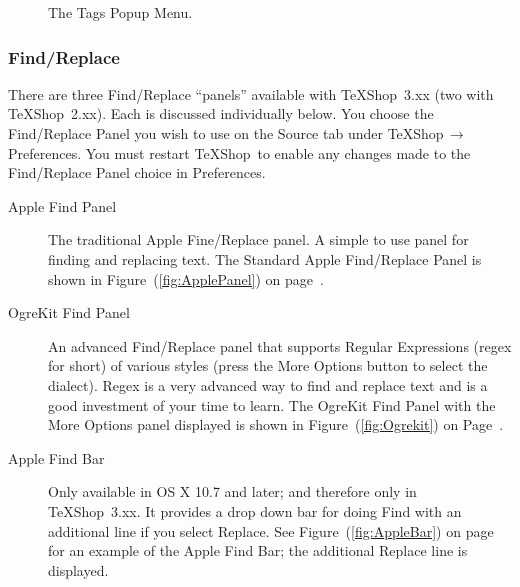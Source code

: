 \documentclass[letterpaper,11pt]{article}
\newcommand{\TS}{\textsf{\TeX Shop}}
\newcommand{\acr}[1]{\textsf{#1}}
\newcommand{\cmd}[1]{\textsf{#1}}
\newcommand{\mnu}[1]{\textsf{#1}}
\newcommand{\To}{\,\(\to\)\,}
\begin{document}
\begin{figure}
\centering
{}
\caption{The Tags Popup Menu.}
\label{fig:Tags}
\end{figure}

\subsubsection{Find/Replace}

There are three \acr{Find/Replace} ``panels'' available with \TS\ 3.xx (two with \TS\ 2.xx). Each is discussed individually below. You choose the Find/Replace Panel you wish to use on the \mnu{Source} tab under \mnu{TeXShop}\To\mnu{Preferences}. You must restart \TS\ to enable any changes made to the Find/Replace Panel choice in \mnu{Preferences}.
\begin{description}
\item[Apple Find Panel]
The traditional Apple Fine/Replace panel. A simple to use panel for finding and replacing text.   The Standard Apple Find/Replace Panel is shown in Figure~(\ref{fig:ApplePanel}) on page~\pageref{fig:ApplePanel}.
\item[OgreKit Find Panel]
An advanced Find/Replace panel that supports Regular Expressions (\acr{regex} for short) of various styles (press the More Options button to select the dialect). \acr{Regex} is a very advanced way to find and replace text and is a good investment of your time to learn. The OgreKit Find Panel with the \cmd{More Options} panel displayed is shown in Figure~(\ref{fig:Ogrekit}) on Page~\pageref{fig:Ogrekit}.
\item[Apple Find Bar]
Only available in \cmd{OS X 10.7} and later; and therefore only in \acr{\TS\ 3.xx}. It provides a drop down bar for doing Find with an additional line if you select Replace. See Figure~(\ref{fig:AppleBar}) on page~\pageref{fig:AppleBar} for an example of the Apple Find Bar; the additional Replace line is displayed.
\end{description}
\end{document}
